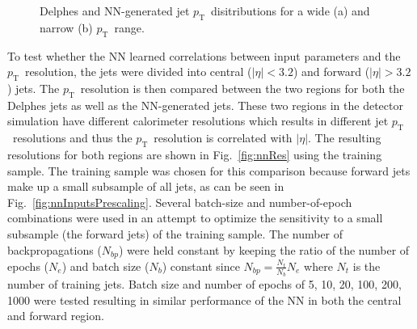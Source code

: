 \documentclass[showpacs,showkeys,preprint,prd,nofootinbib,linenumbers,12pt,superscriptaddress]{revtex4-1}
\def\pt{\ensuremath{p_{\mathrm{T}}}}
\begin{document}
\begin{figure}[htb]
  \caption{Delphes and NN-generated jet \pt\ disitributions for a wide (a) and narrow (b) \pt\ range.}
  \label{fig:pTNNVsDelphes}
\end{figure}

To test whether the NN learned correlations between input parameters and the \pt\ resolution, the jets were divided into central ($|\eta|<3.2$) and forward ($|\eta|>3.2$) jets. The \pt\ resolution is then compared between the two regions for both the Delphes jets as well as the NN-generated jets. These two regions in the detector simulation have different calorimeter resolutions which results in different jet \pt\ resolutions and thus the \pt\ resolution is correlated with $|\eta|$. The resulting resolutions for both regions are shown in Fig.~\ref{fig:nnRes} using the training sample. The training sample was chosen for this comparison because forward jets make up a small subsample of all jets, as can be seen in Fig.~\ref{fig:nnInputsPrescaling}. Several batch-size and number-of-epoch combinations were used in an attempt to optimize the sensitivity to a small subsample (the forward jets) of the training sample. The number of backpropagations ($N_{bp}$) were held constant by keeping the ratio of the number of epochs ($N_e$) and batch size ($N_b$) constant since $N_{bp}=\frac{N_t}{N_b}N_e$ where $N_t$ is the number of training jets. Batch size and number of epochs of 5, 10, 20, 100, 200, 1000 were tested resulting in similar performance of the NN in both the central and forward region.
\end{document}
